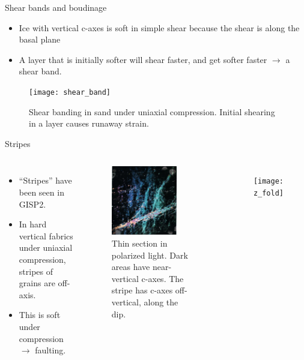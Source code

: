 \documentclass{beamer}
\begin{document}
\begin{frame}{Shear bands and boudinage}
   \begin{itemize}
      \item  Ice with vertical c-axes is soft in simple shear because the shear is along the basal plane
      \item A layer that is initially softer will shear faster, and get softer faster
      $\rightarrow$ a shear band.
\end{itemize}
   \begin{figure}
      \texttt{[image: shear\_band]}
      \caption{Shear banding in sand under uniaxial compression. Initial shearing in a layer causes runaway strain.}
   \end{figure}
\end{frame}

\begin{frame}{Stripes}
   \begin{columns}[T]
      \begin{itemize}
   \item ``Stripes'' have been seen in GISP2.
   \item In hard vertical fabrics under uniaxial compression, stripes of grains are off-axis.
   \item This is soft under compression $\rightarrow$ faulting.
\end{itemize}
     \begin{figure}
     \includegraphics[width=0.8\textwidth]{stripes}
     \caption{Thin section in polarized light. Dark areas have near-vertical c-axes. The stripe has c-axes off-vertical, along the dip.}
  \end{figure}
     \begin{figure}
     \texttt{[image: z\_fold]}
     \caption{\citet{alley97}}
  \end{figure}
  \end{columns}
  \end{frame}
\end{document}
